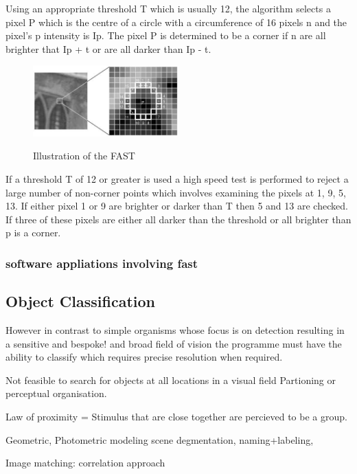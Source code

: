 \documentclass{mproj}
\begin{document}
Using an appropriate threshold T which is usually 12, the algorithm selects a pixel P which is the centre of a circle with a circumference of 16 pixels n and the pixel's p intensity is Ip. The pixel P is determined to be a corner if n are all brighter that  Ip + t or are all darker than Ip - t. 

\begin{figure}[h]
  \caption{Illustration of the FAST}
  \centering
  \includegraphics[width=0.5\textwidth]{images/fast_speedtest.jpg}
  \label{fig:FAST diagram}
\end{figure}

If a threshold T of 12 or greater is used a high speed test is performed to reject a large number of non-corner points which involves examining the pixels at 1, 9, 5, 13. If either pixel 1 or 9 are brighter or darker than T then 5 and 13 are checked. If three of these pixels are either all darker than the threshold or all brighter than p is a corner. 

\subsubsection{software appliations involving fast}

\subsection{Object Classification}

However in contrast to simple organisms whose focus is on detection resulting in a sensitive and bespoke! and broad field of vision the programme must have the ability to classify which requires precise resolution when required.

Not feasible to search for objects at all locations in a visual field
Partioning or perceptual organisation.

Law of proximity = Stimulus that are close together are percieved to be a group.

Geometric, Photometric modeling scene degmentation, naming+labeling,

Image matching:
correlation approach
 
\end{document}
